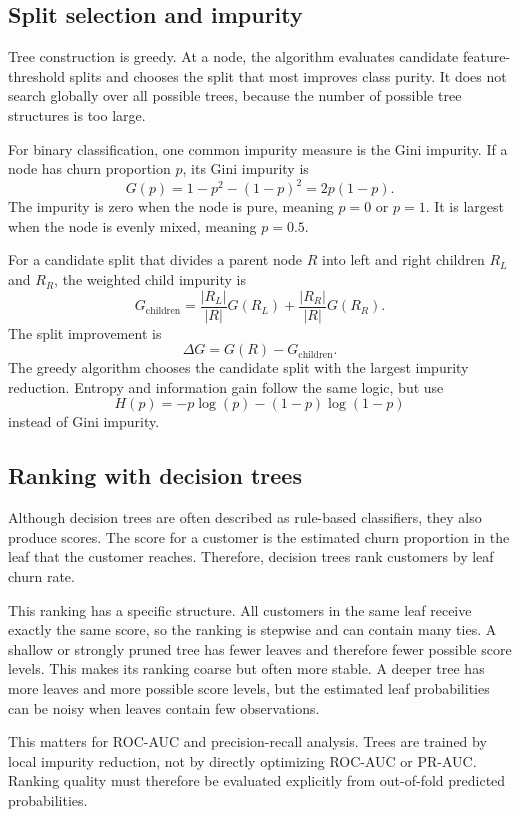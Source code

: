 \subsection{Split selection and impurity}

Tree construction is greedy. At a node, the algorithm evaluates candidate feature-threshold splits and chooses the split that most improves class purity. It does not search globally over all possible trees, because the number of possible tree structures is too large.

For binary classification, one common impurity measure is the Gini impurity. If a node has churn proportion \(p\), its Gini impurity is
\[
G(p)
=
1-p^2-(1-p)^2
=
2p(1-p).
\]
The impurity is zero when the node is pure, meaning \(p=0\) or \(p=1\). It is largest when the node is evenly mixed, meaning \(p=0.5\).

For a candidate split that divides a parent node \(R\) into left and right children \(R_L\) and \(R_R\), the weighted child impurity is
\[
G_{\mathrm{children}}
=
\frac{|R_L|}{|R|}G(R_L)
+
\frac{|R_R|}{|R|}G(R_R).
\]
The split improvement is
\[
\Delta G
=
G(R)-G_{\mathrm{children}}.
\]
The greedy algorithm chooses the candidate split with the largest impurity reduction. Entropy and information gain follow the same logic, but use
\[
H(p)
=
-p\log(p)-(1-p)\log(1-p)
\]
instead of Gini impurity.

\subsection{Ranking with decision trees}

Although decision trees are often described as rule-based classifiers, they also produce scores. The score for a customer is the estimated churn proportion in the leaf that the customer reaches. Therefore, decision trees rank customers by leaf churn rate.

This ranking has a specific structure. All customers in the same leaf receive exactly the same score, so the ranking is stepwise and can contain many ties. A shallow or strongly pruned tree has fewer leaves and therefore fewer possible score levels. This makes its ranking coarse but often more stable. A deeper tree has more leaves and more possible score levels, but the estimated leaf probabilities can be noisy when leaves contain few observations.

This matters for ROC-AUC and precision-recall analysis. Trees are trained by local impurity reduction, not by directly optimizing ROC-AUC or PR-AUC. Ranking quality must therefore be evaluated explicitly from out-of-fold predicted probabilities.

